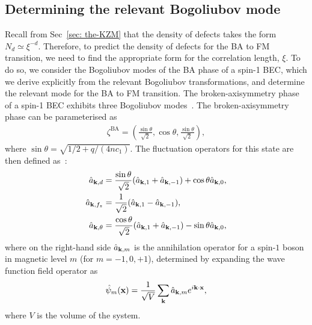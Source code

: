 \subsection{Determining the relevant Bogoliubov mode}\label{subsec: bogoliubov-modes}
Recall from Sec~\ref{sec: the-KZM} that the density of defects takes the form
\(N_d \simeq \xi^{-d}\).
Therefore, to predict the density of defects for the BA to FM transition, we
need to find the appropriate form for the correlation length, \(\xi \).
To do so, we consider the Bogoliubov modes of the BA phase of a spin-1 BEC,
which we derive explicitly from the relevant Bogoliubov transformations, and
determine the relevant mode for the  BA to FM transition.
The broken-axisymmetry phase of a spin-1 BEC exhibits three Bogoliubov
modes~\cite{Uchino2010}.
The broken-axisymmetry phase can be parameterised as
\begin{align}
    \zeta^\text{BA} = \left(\frac{\sin\theta}{\sqrt{2}}, \cos\theta,
    \frac{\sin\theta}{\sqrt{2}}\right),
\end{align}
where \(\sin\theta = \sqrt{1/2+q/(4nc_1)}\).
The fluctuation operators for this state are then defined as~\cite{Uchino2010}:
\begin{align}
    \hat{a}_{\vb{k}, d} &= \frac{\sin\theta}{\sqrt{2}}(\hat{a}_{\vb{k}, 1}
    + \hat{a}_{\vb{k}, -1}) + \cos\theta \hat{a}_{\vb{k}, 0}, \\
    \hat{a}_{\vb{k}, f_z} &= \frac{1}{\sqrt{2}}(\hat{a}_{\vb{k}, 1}
    - \hat{a}_{\vb{k}, -1}), \\
    \hat{a}_{\vb{k}, \theta} &= \frac{\cos\theta}{\sqrt{2}}(\hat{a}_{\vb{k}, 1}
    + \hat{a}_{\vb{k}, -1}) - \sin\theta \hat{a}_{\vb{k}, 0},
\end{align}
where on the right-hand side \(\hat{a}_{\vb{k}, m}\) is the annihilation
operator for a spin-\(1\) boson in magnetic level \(m\) (for \(m=-1,0,+1\)),
determined by expanding the wave function field operator as
\begin{align}
    \hat{\psi}_m(\vb{x}) = \frac{1}{\sqrt{V}}\sum_{\vb{k}}
    \hat{a}_{\vb{k}, m}e^{i\vb{k}\cdot \vb{x}},
\end{align}
where \(V\) is the volume of the system.

